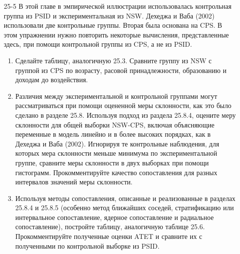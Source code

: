 \begin{enumerate}
\item[25-5] В этой главе в эмпирической иллюстрации использовалась контрольная группа из PSID и экспериментальная из NSW. Дехеджа и Ваба (2002) использовали две контрольные группы. Вторая была основана на CPS. В этом упражнении нужно повторить некоторые вычисления, представленные здесь, при помощи контрольной группы из CPS, а не из PSID. 
\begin{enumerate}
\item Сделайте таблицу, аналогичную 25.3. Сравните группу из NSW с группой из CPS по возрасту, расовой принадлежности, образованию и доходам до воздействия.  
\item Различия между экспериментальной и контрольной группами могут рассматриваться при помощи оцененной меры склонности, как это было сделано в разделе 25.8. Используя подход из раздела 25.8.4, оцените меру склонности для общей выборки NSW-CPS, включая объясняющие переменные в модель линейно и в более высоких порядках, как в Дехеджа и Ваба (2002). Игнорируя те контрольные наблюдения, для которых мера склонности меньше минимума по экспериментальной группе, сравните меры склонности в двух выборках при помощи гистограмм. Прокомментируйте качество сопоставления для разных интервалов значений меры склонности. 
\item Используя методы сопоставления, описанные и реализованные в разделах 25.8.4 и 25.8.5 (особенно метод ближайших соседей, стратификацию или интервальное сопоставление, ядерное сопоставление и радиальное сопоставление), постройте таблицу, аналогичную таблице 25.6. Прокомментируйте полученные оценки ATET и сравните их с полученными по контрольной выборке из PSID. 
\end{enumerate}

\end{enumerate}



